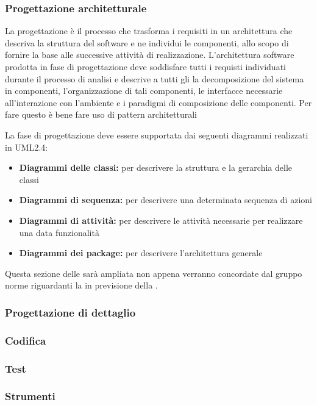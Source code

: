 \documentclass[12pt,a4paper]{article}
\begin{document}
\subsubsection{Progettazione architetturale}
La progettazione è il processo che trasforma i requisiti in un architettura che descriva la struttura del software e ne individui le componenti, allo scopo di fornire la base alle successive attività di realizzazione. L'architettura software prodotta in fase di progettazione deve soddisfare tutti i requisti individuati durante il processo di analisi e descrive a tutti gli  la decomposizione del sistema in componenti, l'organizzazione di tali componenti, le interfacce necessarie all'interazione con l'ambiente e i paradigmi di composizione delle componenti. Per fare questo è bene fare uso di pattern architetturali

La fase di progettazione deve essere supportata dai seguenti diagrammi realizzati in UML2.4:
\begin{itemize}
	\item \textbf{Diagrammi delle classi:} per descrivere la struttura e la gerarchia delle classi
	\item \textbf{Diagrammi di sequenza:} per descrivere una determinata sequenza di azioni
	\item \textbf{Diagrammi di attività:} per descrivere le attività necessarie per realizzare una data funzionalità
	\item \textbf{Diagrammi dei package:} per descrivere l'architettura generale
\end{itemize}

Questa sezione delle \NdP{} sarà ampliata non appena verranno concordate dal gruppo norme riguardanti la \FPA{} in previsione della \RP.

\subsubsection{Progettazione di dettaglio}
\TODO{}

\subsubsection{Codifica}
\TODO{}

\subsubsection{Test}

\subsubsection{Strumenti}
\end{document}
